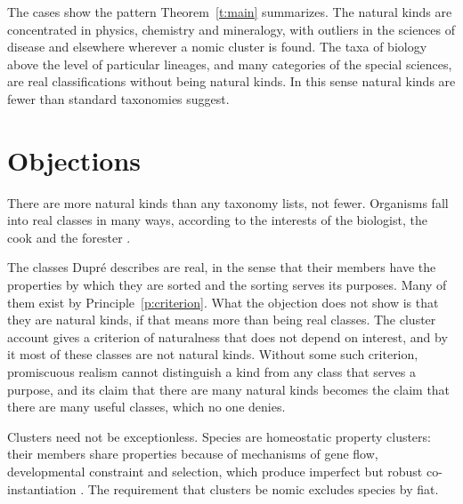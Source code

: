 \documentclass{situationist-preprint}
\begin{document}
The cases show the pattern Theorem~\ref{t:main} summarizes. The natural kinds are concentrated in physics, chemistry and mineralogy, with outliers in the sciences of disease and elsewhere wherever a nomic cluster is found. The taxa of biology above the level of particular lineages, and many categories of the special sciences, are real classifications without being natural kinds. In this sense natural kinds are fewer than standard taxonomies suggest.

\section{Objections}\label{s:objections}

\begin{objection}[Promiscuity]\label{o:dupre}
There are more natural kinds than any taxonomy lists, not fewer. Organisms fall into real classes in many ways, according to the interests of the biologist, the cook and the forester \citep{Dupre1993}.
\end{objection}

\begin{reply}
The classes Dupré describes are real, in the sense that their members have the properties by which they are sorted and the sorting serves its purposes. Many of them exist by Principle~\ref{p:criterion}. What the objection does not show is that they are natural kinds, if that means more than being real classes. The cluster account gives a criterion of naturalness that does not depend on interest, and by it most of these classes are not natural kinds. Without some such criterion, promiscuous realism cannot distinguish a kind from any class that serves a purpose, and its claim that there are many natural kinds becomes the claim that there are many useful classes, which no one denies.
\end{reply}

\begin{objection}\label{o:boyd}
Clusters need not be exceptionless. Species are homeostatic property clusters: their members share properties because of mechanisms of gene flow, developmental constraint and selection, which produce imperfect but robust co-instantiation \citep{Boyd1999}. The requirement that clusters be nomic excludes species by fiat.
\end{objection}
\end{document}
